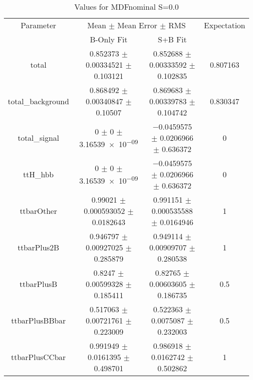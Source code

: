\begin{table}
\centering
\caption{Values for MDFnominal S=0.0}
\begin{tabular}{cccc}
\toprule
Parameter & \multicolumn{2}{c}{Mean $\pm$ Mean Error $\pm$ RMS} & Expectation\\
 & B-Only Fit & S+B Fit & \\
\midrule
total & \num{0.852373} $\pm$ \num{0.00334521} $\pm$ \num{0.103121} & \num{0.852688} $\pm$ \num{0.00333592} $\pm$ \num{0.102835} & \num{0.807163}\\
total\_background & \num{0.868492} $\pm$ \num{0.00340847} $\pm$ \num{0.10507} & \num{0.869683} $\pm$ \num{0.00339783} $\pm$ \num{0.104742} & \num{0.830347}\\
total\_signal & \num{0} $\pm$ \num{0} $\pm$ \num{3.16539e-09} & \num{-0.0459575} $\pm$ \num{0.0206966} $\pm$ \num{0.636372} & \num{0}\\
ttH\_hbb & \num{0} $\pm$ \num{0} $\pm$ \num{3.16539e-09} & \num{-0.0459575} $\pm$ \num{0.0206966} $\pm$ \num{0.636372} & \num{0}\\
ttbarOther & \num{0.99021} $\pm$ \num{0.000593052} $\pm$ \num{0.0182643} & \num{0.991151} $\pm$ \num{0.000535588} $\pm$ \num{0.0164946} & \num{1}\\
ttbarPlus2B & \num{0.946797} $\pm$ \num{0.00927025} $\pm$ \num{0.285879} & \num{0.949114} $\pm$ \num{0.00909707} $\pm$ \num{0.280538} & \num{1}\\
ttbarPlusB & \num{0.8247} $\pm$ \num{0.00599328} $\pm$ \num{0.185411} & \num{0.82765} $\pm$ \num{0.00603605} $\pm$ \num{0.186735} & \num{0.5}\\
ttbarPlusBBbar & \num{0.517063} $\pm$ \num{0.00721761} $\pm$ \num{0.223009} & \num{0.522363} $\pm$ \num{0.0075087} $\pm$ \num{0.232003} & \num{0.5}\\
ttbarPlusCCbar & \num{0.991949} $\pm$ \num{0.0161395} $\pm$ \num{0.498701} & \num{0.986918} $\pm$ \num{0.0162742} $\pm$ \num{0.502862} & \num{1}\\
\bottomrule
\end{tabular}
\end{table}